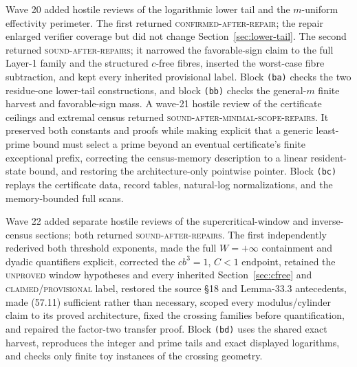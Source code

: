 \documentclass[10pt,reqno]{amsart}
\theoremstyle{definition}
\newcommand{\1}{\mathbf 1}
\begin{document}
Wave 20 added hostile reviews of the logarithmic lower tail and the
$m$-uniform effectivity perimeter.  The first returned
\textsc{confirmed-after-repair}; the repair enlarged verifier coverage but
did not change Section~\ref{sec:lower-tail}.  The second returned
\textsc{sound-after-repairs}; it narrowed the favorable-sign claim to the
full Layer-1 family and the structured $c$-free fibres, inserted the
worst-case fibre subtraction, and kept every inherited provisional label.
Block \texttt{(ba)} checks the two residue-one lower-tail constructions, and
block \texttt{(bb)} checks the general-$m$ finite harvest and favorable-sign
mass.  A wave-21 hostile review of the certificate ceilings and extremal
census returned \textsc{sound-after-minimal-scope-repairs}.  It preserved
both constants and proofs while making explicit that a generic least-prime
bound must select a prime beyond an eventual certificate's finite exceptional
prefix, correcting the census-memory description to a linear resident-state
bound, and restoring the architecture-only pointwise pointer.  Block
\texttt{(bc)} replays the certificate data, record tables, natural-log
normalizations, and the memory-bounded full scans.

Wave 22 added separate hostile reviews of the supercritical-window and
inverse-census sections; both returned \textsc{sound-after-repairs}.  The
first independently rederived both threshold exponents, made the full
$W=+\infty$ containment and dyadic quantifiers explicit, corrected the
$cb^3=1$, $C<1$ endpoint, retained the \textsc{unproved} window hypotheses
and every inherited Section~\ref{sec:cfree} and
\textsc{claimed/provisional} label, restored the source \S18 and Lemma-33.3
antecedents, made (57.11) sufficient rather than necessary, scoped every
modulus/cylinder claim to its proved architecture, fixed the crossing
families before quantification, and repaired the factor-two transfer proof.
Block \texttt{(bd)} uses the shared exact harvest, reproduces the integer and
prime tails and exact displayed logarithms, and checks only finite toy
instances of the crossing geometry.
\end{document}
